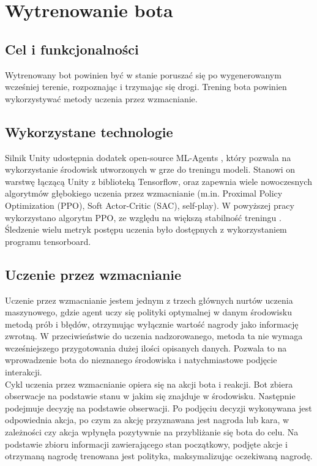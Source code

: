 \chapter{Wytrenowanie bota}
\thispagestyle{chapterBeginStyle}

\section{Cel i funkcjonalności}
Wytrenowany bot powinien być w stanie poruszać się po wygenerowanym wcześniej terenie, rozpoznając i trzymając się drogi. Trening bota powinien wykorzystywać metody uczenia przez wzmacnianie.

\section{Wykorzystane technologie}
Silnik Unity udostępnia dodatek open-source ML-Agents \cite{UnityMlAgentsRepository} \cite{UnityMlAgents}, który pozwala na wykorzystanie środowisk utworzonych w grze do treningu modeli. Stanowi on warstwę łączącą Unity z biblioteką Tensorflow, oraz zapewnia wiele nowoczesnych algorytmów głębokiego uczenia przez wzmacnianie (m.in. Proximal Policy Optimization (PPO), Soft Actor-Critic (SAC), self-play). W powyższej pracy wykorzystano algorytm PPO, ze względu na większą stabilność treningu \cite{CompareDrlAlgorithms}. Śledzenie wielu metryk postępu uczenia było dostępnych z wykorzystaniem programu tensorboard.

\section{Uczenie przez wzmacnianie}
Uczenie przez wzmacnianie jestem jednym z trzech głównych nurtów uczenia maszynowego, gdzie agent uczy się polityki optymalnej w danym środowisku metodą prób i błędów, otrzymując wyłącznie wartość nagrody jako informację zwrotną. W przeciwieństwie do uczenia nadzorowanego, metoda ta nie wymaga wcześniejszego przygotowania dużej ilości opisanych danych. Pozwala to na wprowadzenie bota do nieznanego środowiska i natychmiastowe podjęcie interakcji.\\
Cykl uczenia przez wzmacnianie opiera się na akcji bota i reakcji. Bot zbiera obserwacje na podstawie stanu w jakim się znajduje w środowisku. Następnie podejmuje decyzję na podstawie obserwacji. Po podjęciu decyzji wykonywana jest odpowiednia akcja, po czym za akcję przyznawana jest nagroda lub kara, w zależności czy akcja wpłynęła pozytywnie na przybliżanie się bota do celu. Na podstawie zbioru informacji zawierającego stan początkowy, podjęte akcje i otrzymaną nagrodę trenowana jest polityka, maksymalizując oczekiwaną nagrodę.
\clearpage
